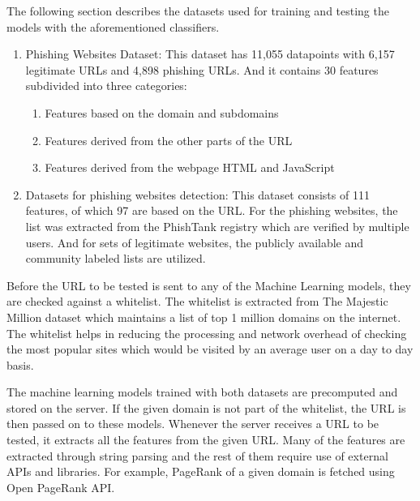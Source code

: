 \documentclass[conference]{IEEEtran}
\begin{document}
\par The following section describes the datasets used for training and testing the models with the aforementioned classifiers.
\begin{enumerate}
    \item Phishing Websites Dataset\cite{UCIDataset}:
          This dataset has 11,055 datapoints with 6,157 legitimate URLs and 4,898 phishing URLs.
          And it contains 30 features subdivided into three categories:
          \begin{enumerate}
              \item Features based on the domain and subdomains
              \item Features derived from the other parts of the URL
              \item Features derived from the webpage HTML and JavaScript
          \end{enumerate}
    \item Datasets for phishing websites detection\cite{GregaDataset}:
          This dataset consists of 111 features, of which 97 are based on the URL.
          For the phishing websites, the list was extracted from the PhishTank registry which are verified by multiple users.
          And for sets of legitimate websites, the publicly available and community labeled lists are utilized\cite{citizenlablists}.
\end{enumerate}

\par Before the URL to be tested is sent to any of the Machine Learning models, they are checked against a whitelist.
The whitelist is extracted from The Majestic Million dataset\cite{MajesticMillion} which maintains a list of top 1 million domains on the internet.
The whitelist helps in reducing the processing and network overhead of checking the most popular sites which would be visited by an average user on a day to day basis.

\par The machine learning models trained with both datasets are precomputed and stored on the server.
If the given domain is not part of the whitelist, the URL is then passed on to these models.
Whenever the server receives a URL to be tested, it extracts all the features from the given URL.
Many of the features are extracted through string parsing and the rest of them require use of external APIs and libraries.
For example, PageRank of a given domain is fetched using Open PageRank API\cite{OpenPageRank}.
\end{document}

